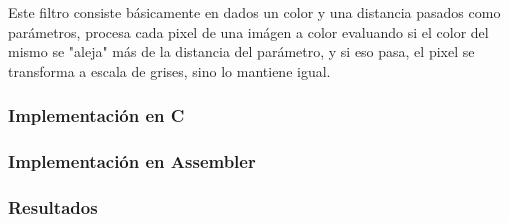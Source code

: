 Este filtro consiste b\'asicamente en dados un color y una distancia pasados como par\'ametros, procesa cada pixel de una im\'agen a color evaluando si el color del mismo se "aleja" m\'as de la distancia del par\'ametro, y si eso pasa, el pixel se transforma a escala de grises, sino lo mantiene igual.

\subsubsection{Implementación en C}


\subsubsection{Implementación en Assembler}


\subsubsection{Resultados}
